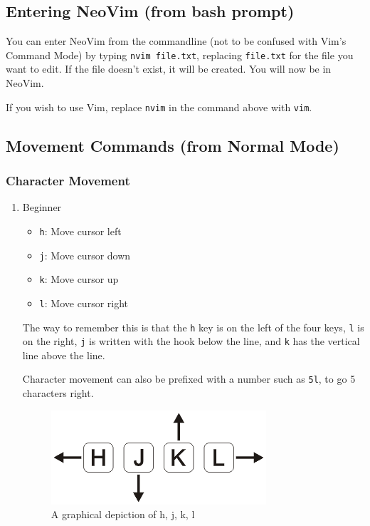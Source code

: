 \documentclass[11pt]{article}
\begin{document}
\subsection{Entering NeoVim (from bash prompt)}
\label{sec:orgec4ae04}
You can enter NeoVim from the commandline (not to be confused with Vim's Command
Mode) by typing \texttt{nvim file.txt}, replacing \texttt{file.txt} for the file you want to
edit. If the file doesn't exist, it will be created. You will now be in NeoVim.

If you wish to use Vim, replace \texttt{nvim} in the command above with \texttt{vim}.
\subsection{Movement Commands (from Normal Mode)}
\label{sec:orgf834c36}
\subsubsection{Character Movement}
\label{sec:org18f6e73}
\begin{enumerate}
\item Beginner
\label{sec:orgeac4f5b}
\begin{itemize}
\item \texttt{h}: Move cursor left
\item \texttt{j}: Move cursor down
\item \texttt{k}: Move cursor up
\item \texttt{l}: Move cursor right
\end{itemize}

The way to remember this is that the \texttt{h} key is on the left of the four keys,
\texttt{l} is on the right, \texttt{j} is written with the hook below the line, and \texttt{k} has
the vertical line above the line.

Character movement can also be prefixed with a number such as \texttt{5l}, to go 5
characters right.

\begin{figure}[htbp]
\centering
\includegraphics[width=.9\linewidth]{./hjkl.png}
\caption{\label{fig:orgc350594}
A graphical depiction of h, j, k, l}
\end{figure}
\end{enumerate}
\end{document}

